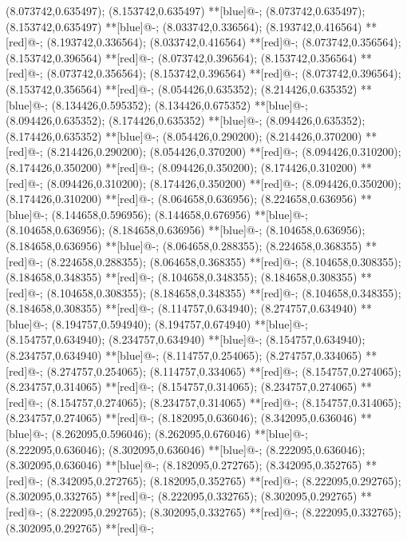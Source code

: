 (8.073742,0.635497); (8.153742,0.635497) **[blue]@{-};
(8.073742,0.635497); (8.153742,0.635497) **[blue]@{-};
(8.033742,0.336564); (8.193742,0.416564) **[red]@{-};
(8.193742,0.336564); (8.033742,0.416564) **[red]@{-};
(8.073742,0.356564); (8.153742,0.396564) **[red]@{-};
(8.073742,0.396564); (8.153742,0.356564) **[red]@{-};
(8.073742,0.356564); (8.153742,0.396564) **[red]@{-};
(8.073742,0.396564); (8.153742,0.356564) **[red]@{-};
(8.054426,0.635352); (8.214426,0.635352) **[blue]@{-};
(8.134426,0.595352); (8.134426,0.675352) **[blue]@{-};
(8.094426,0.635352); (8.174426,0.635352) **[blue]@{-};
(8.094426,0.635352); (8.174426,0.635352) **[blue]@{-};
(8.054426,0.290200); (8.214426,0.370200) **[red]@{-};
(8.214426,0.290200); (8.054426,0.370200) **[red]@{-};
(8.094426,0.310200); (8.174426,0.350200) **[red]@{-};
(8.094426,0.350200); (8.174426,0.310200) **[red]@{-};
(8.094426,0.310200); (8.174426,0.350200) **[red]@{-};
(8.094426,0.350200); (8.174426,0.310200) **[red]@{-};
(8.064658,0.636956); (8.224658,0.636956) **[blue]@{-};
(8.144658,0.596956); (8.144658,0.676956) **[blue]@{-};
(8.104658,0.636956); (8.184658,0.636956) **[blue]@{-};
(8.104658,0.636956); (8.184658,0.636956) **[blue]@{-};
(8.064658,0.288355); (8.224658,0.368355) **[red]@{-};
(8.224658,0.288355); (8.064658,0.368355) **[red]@{-};
(8.104658,0.308355); (8.184658,0.348355) **[red]@{-};
(8.104658,0.348355); (8.184658,0.308355) **[red]@{-};
(8.104658,0.308355); (8.184658,0.348355) **[red]@{-};
(8.104658,0.348355); (8.184658,0.308355) **[red]@{-};
(8.114757,0.634940); (8.274757,0.634940) **[blue]@{-};
(8.194757,0.594940); (8.194757,0.674940) **[blue]@{-};
(8.154757,0.634940); (8.234757,0.634940) **[blue]@{-};
(8.154757,0.634940); (8.234757,0.634940) **[blue]@{-};
(8.114757,0.254065); (8.274757,0.334065) **[red]@{-};
(8.274757,0.254065); (8.114757,0.334065) **[red]@{-};
(8.154757,0.274065); (8.234757,0.314065) **[red]@{-};
(8.154757,0.314065); (8.234757,0.274065) **[red]@{-};
(8.154757,0.274065); (8.234757,0.314065) **[red]@{-};
(8.154757,0.314065); (8.234757,0.274065) **[red]@{-};
(8.182095,0.636046); (8.342095,0.636046) **[blue]@{-};
(8.262095,0.596046); (8.262095,0.676046) **[blue]@{-};
(8.222095,0.636046); (8.302095,0.636046) **[blue]@{-};
(8.222095,0.636046); (8.302095,0.636046) **[blue]@{-};
(8.182095,0.272765); (8.342095,0.352765) **[red]@{-};
(8.342095,0.272765); (8.182095,0.352765) **[red]@{-};
(8.222095,0.292765); (8.302095,0.332765) **[red]@{-};
(8.222095,0.332765); (8.302095,0.292765) **[red]@{-};
(8.222095,0.292765); (8.302095,0.332765) **[red]@{-};
(8.222095,0.332765); (8.302095,0.292765) **[red]@{-};
